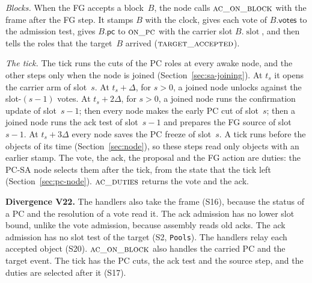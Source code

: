 \documentclass{article}
\newcommand{\slot}{\operatorname{slot}}
\newcommand{\pc}{\mathsf{pc}}
\newcommand{\PCdiv}[2]{\par\noindent\textbf{Divergence #1.} #2\par}
\newcommand{\nm}[1]{\nolinkurl{#1}}
\begin{document}
\emph{Blocks.}  When the FG accepts a block~$B$, the node calls
$\Call{ac\_on\_block}{}$ with the frame after the FG step.  It stamps $B$
with the clock, gives each vote of $B.\mathsf{votes}$ to the admission
test, gives $B.\pc$ to $\Call{on\_pc}{}$ with the carrier slot $B.\slot$,
and then tells the roles that the target~$B$ arrived
($\Call{target\_accepted}{}$).

\emph{The tick.}  The tick runs the cuts of the PC roles at every awake
node, and the other steps only when the node is joined
(Section~\ref{sec:sa-joining}).  At $t_s$ it opens the carrier arm of
slot~$s$.  At $t_s+\Delta$, for $s>0$, a joined node unlocks against the
slot-$(s-1)$ votes.  At $t_s+2\Delta$, for $s>0$, a joined node runs the
confirmation update of slot~$s-1$; then every node makes the early PC cut
of slot~$s$; then a joined node runs the ack test of slot~$s-1$ and
prepares the FG source of slot~$s-1$.  At $t_s+3\Delta$ every node saves
the PC freeze of slot~$s$.  A tick runs before the objects of its time
(Section~\ref{sec:node}), so these steps read only objects with an earlier
stamp.  The vote, the ack, the proposal and the FG action are duties: the
PC-SA node selects them after the tick, from the state that the tick left
(Section~\ref{sec:pc-node}).  $\Call{ac\_duties}{}$ returns the vote and
the ack.

\PCdiv{V22}{The handlers also take the frame (S16), because the status of
a PC and the resolution of a vote read it.  The ack admission has no lower
slot bound, unlike the vote admission, because assembly reads old acks.
The ack admission has no slot test of the target (S2, \nm{Pools}).  The
handlers relay each accepted object (S20).  $\Call{ac\_on\_block}{}$ also
handles the carried PC and the target event.  The tick has the PC cuts,
the ack test and the source step, and the duties are selected after it
(S17).}
\end{document}
